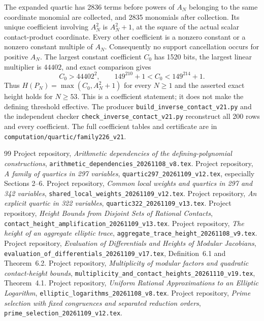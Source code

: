 \documentclass[11pt,a4paper]{article}
\begin{document}
The expanded quartic has 2836 terms before powers of $A_N$ belonging
to the same coordinate monomial are collected, and 2835 monomials
after collection. Its unique coefficient involving $A_N^2$ is
$A_N^2+1$, at the square of the actual scalar contact-product coordinate.
Every other coefficient is a nonzero constant or a nonzero constant
multiple of $A_N$. Consequently no support cancellation occurs for
positive $A_N$. The largest constant coefficient $C_0$ has 1520 bits,
the largest linear multiplier is $44402$, and exact comparison
gives
\[
 C_0>44402^2,\qquad
 149^{210}+1<C_0<149^{214}+1.
\]
Thus $H(P_N)=\max(C_0,A_N^2+1)$ for every $N\ge1$ and the asserted
exact height holds for $N\ge53$. This is a coefficient statement;
it does not make the defining threshold effective. The producer
\nolinkurl{build_inverse_contact_v21.py} and the independent checker
\nolinkurl{check_inverse_contact_v21.py} reconstruct all 200 rows and
every coefficient. The full coefficient tables and certificate are in
\nolinkurl{computation/quartic/family226_v21}.

\begin{thebibliography}{99}\small\setlength{\itemsep}{2pt}
 Project repository,
\emph{Arithmetic dependencies of the defining-polynomial constructions},
\nolinkurl{arithmetic_dependencies_20261108_v8.tex}.
 Project repository,
\emph{A family of quartics in 297 variables},
\nolinkurl{quartic297_20261109_v12.tex}, especially Sections 2--6.
 Project repository,
\emph{Common local weights and quartics in 297 and 342 variables},
\nolinkurl{shared_local_weights_20261109_v12.tex}.
 Project repository,
\emph{An explicit quartic in 322 variables},
\nolinkurl{quartic322_20261109_v13.tex}.
 Project repository,
\emph{Height Bounds from Disjoint Sets of Rational Contacts},
\nolinkurl{contact_height_amplification_20261109_v13.tex}.
 Project repository,
\emph{The height of an aggregate elliptic trace},
\nolinkurl{aggregate_trace_height_20261108_v9.tex}.
 Project repository,
\emph{Evaluation of Differentials and Heights of Modular Jacobians},
\nolinkurl{evaluation_of_differentials_20261109_v17.tex},
Definition~6.1 and Theorem~6.2.
 Project repository,
\emph{Multiplicity of modular factors and quadratic contact-height bounds},
\nolinkurl{multiplicity_and_contact_heights_20261110_v19.tex},
Theorem~4.1.
 Project repository,
\emph{Uniform Rational Approximations to an Elliptic Logarithm},
\nolinkurl{elliptic_logarithms_20261108_v8.tex}.
 Project repository,
\emph{Prime selection with fixed congruences and separated reduction orders},
\nolinkurl{prime_selection_20261109_v12.tex}.
\end{thebibliography}
\end{document}

